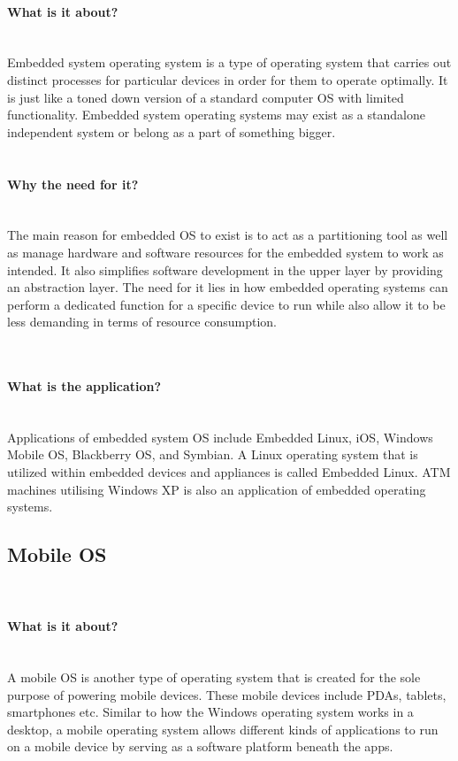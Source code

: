 \documentclass[conference]{IEEEtran}
\begin{document}
\paragraph{What is it about?}\mbox{} \\
Embedded system operating system is a type of operating system that carries out distinct processes for particular devices in order for them to operate optimally. It is just like a toned down version of a standard computer OS with limited functionality\cite{TNEOS}. Embedded system operating systems may exist as a standalone independent system or belong as a part of something bigger\cite{ITEOSMC}. \\

\\
\paragraph{Why the need for it?}\mbox{} \\
The main reason for embedded OS to exist is to act as a partitioning tool as well as manage hardware and software resources for the embedded system to work as intended. It also simplifies software development in the upper layer by providing an abstraction layer. The need for it lies in how embedded operating systems can perform a dedicated function for a specific device to run while also allow it to be less demanding in terms of resource consumption\cite{ITEOSPV}.

\\
\paragraph{What is the application?}\mbox{} \\
Applications of embedded system OS include Embedded Linux, iOS, Windows Mobile OS, Blackberry OS, and Symbian. A Linux operating system that is utilized within embedded devices and appliances is called Embedded Linux. ATM machines utilising Windows XP is also an application of embedded operating systems.

\subsection{Mobile OS}\\
\paragraph{What is it about?}\mbox{} \\
A mobile OS is another type of operating system that is created for the sole purpose of powering mobile devices. These mobile devices include PDAs, tablets, smartphones etc. Similar to how the Windows operating system works in a desktop, a mobile operating system allows different kinds of applications to run on a mobile device by serving as a software platform beneath the apps.
\\
\end{document}
